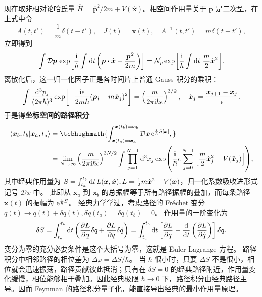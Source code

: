 现在取非相对论哈氏量 $\hat H=\hat{\bm p}^2/2m+V(\hat{\bm x})$。相空间作用量关于 $\bm p$ 是二次型，在上式中令
\[
    A(t,t')=\frac{1}{m}\delta(t-t'),\quad
    J(t)=\dot{\bm x}(t),\quad
    A^{-1}(t,t')=m\delta(t-t'),
\]
立即得到
\[
    \int\mathcal D\bm p\,
    \exp[\frac{\i}{\hbar}\int\d{t}
    \left(\bm p\vdot\dot{\bm x}-\frac{\bm p^2}{2m}\right)]
    =\mathcal N_p
    \exp[\frac{\i}{\hbar}\int\d{t}\,\frac{m}{2}\dot{\bm x}^2].
\]
离散化后，这一归一化因子正是各时间片上普通 Gauss 积分的乘积：
\[
    \int \frac{\dd[3]{p_j}}{(2\pi\hbar)^3}
    \exp[-\frac{\mathrm{i}\epsilon}{2m\hbar}
    (\bm p_j-m\dot{\bm x}_j)^2]
    =\left(\frac{m}{2\pi\mathrm{i}\hbar\epsilon}\right)^{3/2},\quad
    \dot{\bm x}_j=\frac{\bm x_{j+1}-\bm x_j}{\epsilon}.
\]
于是得\textbf{坐标空间的路径积分}
\begin{align}
    \ip{\bm x_b,t_b}{\bm x_a,t_a}&=
    \tcbhighmath{
    \int_{\bm x(t_a)=\bm x_a}^{\bm x(t_b)=\bm x_b}
    \mathcal D \bm x\, \e^{\frac{\i}{\hbar}S[\bm x]},
    }\\
    &=\lim_{N\to\infty}
    \left(\frac{m}{2\pi\i\hbar\epsilon}\right)^{3N/2}
    \int\prod_{j=1}^{N-1}\d[3]{x_j}
    \exp(
        \frac{\i}{\hbar}\epsilon
        \sum_{j=0}^{N-1}
        \left[
            \frac{m}{2}\dot{\bm x}_j^2
            -V(\bar{\bm x}_j)
        \right]
    ), \notag
\end{align}
其中经典作用量为 $S=\int_{t_a}^{t_b}\dd{t} L(\bm x,\dot{\bm x}),L=\frac{1}{2}m\dot{\bm x}^2-V(\bm x)$，归一化系数吸收进形式记号 $\mathcal D x$ 中。
此即从 $\bm x_a$ 到 $\bm x_b$ 的总振幅等于所有路径振幅的叠加，而每条路径 $\bm x(t)$ 的振幅为 $\mathrm{e}^{\frac{\mathrm{i}}{\hbar}S}$。
经典力学学过，考虑路径的 Fréchet 变分 $q(t)\to q(t)+\delta q(t),\delta q(t_a)=\delta q(t_b)=0$。
作用量的一阶变化为
\[\delta S
    =
    \int_{t_a}^{t_b}\dd{t}
    \left(
        \pdv{L}{q}\delta q
        +\pdv{L}{\dot q}\delta\dot q
    \right) =
    \int_{t_a}^{t_b}\dd{t}
    \left[
        \pdv{L}{q}
        -
        \dv{t}\left(\pdv{L}{\dot q}\right)
    \right]\delta q.\]
变分为零的充分必要条件是这个大括号为零，这就是 Euler-Lagrange 方程。
路径积分中相邻路径的相位差为 $\Delta\varphi={\Delta S}/{\hbar}$。
当 $\hbar$ 很小时，只要 $\Delta S$ 不是很小，相位就会迅速振荡，路径贡献彼此抵消；只有在 $\delta S=0$ 的经典路径附近，作用量变化缓慢，相位能够相干叠加。因此经典极限 $\hbar\to0$ 下，路径积分由经典路径主导。因而 Feynman 的路径积分量子化，能直接导出经典的最小作用量原理。


